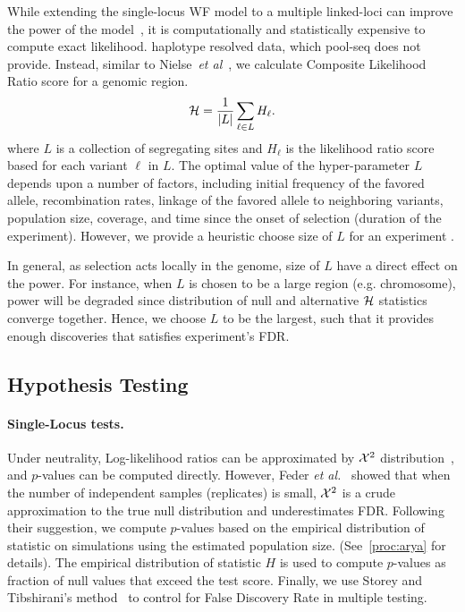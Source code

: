  While extending the single-locus WF model to a multiple linked-loci
 can improve the power of the model~\cite{Terhorst2015Multi}, it is
 computationally and statistically expensive to compute exact
 likelihood.  haplotype resolved data, which pool-seq
 does not provide. Instead, similar to Nielse~\emph{et
   al}~\cite{nielsen2005genomic}, we calculate Composite Likelihood
 Ratio score for a genomic region.
\begin{equation}
{\cal H} = \frac{1}{|L|}\sum_{\ell \in L} H_\ell.
\label{eq:pihmm}
\end{equation}
where $L$ is a collection of segregating sites and $H_\ell$ is the
likelihood ratio score based for each variant $\ell$ in $L$.  The
optimal value of the hyper-parameter $L$ depends upon a number of
factors, including initial frequency of the favored allele,
recombination rates, linkage of the favored allele to neighboring
variants, population size, coverage, and time since the onset of
selection (duration of the experiment). However, we provide a
heuristic choose size of $L$ for an experiment .

In general, as selection acts locally in the genome, size of $L$ have
a direct effect on the power. For instance, when $L$ is chosen to be a
large region (e.g.  chromosome), power will be degraded since
distribution of null and alternative ${\cal H}$ statistics converge
together.  Hence, we choose $L$ to be the largest, such that it
provides enough discoveries that satisfies experiment's FDR.


\subsection{Hypothesis Testing}
\paragraph{Single-Locus tests.}
Under neutrality, Log-likelihood ratios can be approximated by ${\cal X}^2$
distribution~\cite{williams2001weighing}, and $p$-values can be
computed directly. However, Feder \emph{et
  al.}~\cite{feder2014Identifying} showed that when the number of
independent samples (replicates) is small, ${\cal X}^2$ is a crude
approximation to the true null distribution and underestimates
FDR. Following their suggestion, we compute $p$-values based on the
empirical distribution of statistic on simulations using the estimated
population size. (See~\ref{proc:arya} for details).  The empirical
distribution of statistic $H$ is used to compute $p$-values as
fraction of null values that exceed the test score.  Finally, we use
Storey and Tibshirani's method~\cite{storey2003statistical} to control
for False Discovery Rate in multiple testing.


